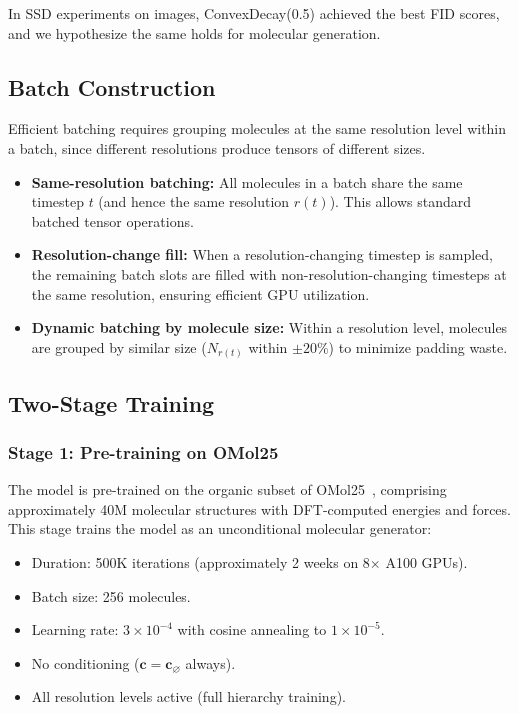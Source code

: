 \documentclass[12pt,a4paper]{article}
\begin{document}
In SSD experiments on images, ConvexDecay(0.5) achieved the best FID scores, and we hypothesize the same holds for molecular generation.

\subsection{Batch Construction}\label{sec:batch}

Efficient batching requires grouping molecules at the same resolution level within a batch, since different resolutions produce tensors of different sizes.

\begin{itemize}
    \item \textbf{Same-resolution batching:} All molecules in a batch share the same timestep $t$ (and hence the same resolution $r(t)$). This allows standard batched tensor operations.
    \item \textbf{Resolution-change fill:} When a resolution-changing timestep is sampled, the remaining batch slots are filled with non-resolution-changing timesteps at the same resolution, ensuring efficient GPU utilization.
    \item \textbf{Dynamic batching by molecule size:} Within a resolution level, molecules are grouped by similar size ($N_{r(t)}$ within $\pm 20\%$) to minimize padding waste.
\end{itemize}

\subsection{Two-Stage Training}\label{sec:two_stage}

\subsubsection{Stage 1: Pre-training on OMol25}

The model is pre-trained on the organic subset of OMol25~\cite{omol25}, comprising approximately 40M molecular structures with DFT-computed energies and forces. This stage trains the model as an unconditional molecular generator:
\begin{itemize}
    \item Duration: 500K iterations (approximately 2 weeks on 8$\times$ A100 GPUs).
    \item Batch size: 256 molecules.
    \item Learning rate: $3 \times 10^{-4}$ with cosine annealing to $1 \times 10^{-5}$.
    \item No conditioning ($\bm{c} = \bm{c}_\varnothing$ always).
    \item All resolution levels active (full hierarchy training).
\end{itemize}
\end{document}
